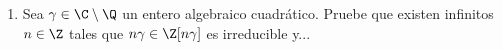 \documentclass[11pt, reqno]{amsart}
\begin{document}
\begin{enumerate}[resume]


	\item Sea $\gamma \in \C \setminus \Q$ un entero algebraico cuadrático.
		Pruebe que existen infinitos $n \in \Z$ tales que $n \gamma \in \Z[n \gamma]$ es irreducible y...
\end{enumerate}

\printbibliography[title={Referencias y lecturas adicionales}]
\end{document}

